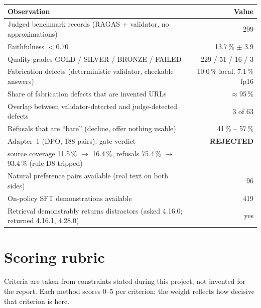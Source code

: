 \documentclass[11pt,a4paper]{article}
\begin{document}
\begin{table}[h]\centering\small
\begin{tabularx}{\textwidth}{Y r}
\toprule
\textbf{Observation} & \textbf{Value} \\
\midrule
Judged benchmark records (RAGAS + validator, no approximations) & 299 \\
 Faithfulness $<0.70$ & 13.7\,\% $\pm$ 3.9 \\
Quality grades GOLD / SILVER / BRONZE / FAILED & 229 / 51 / 16 / 3 \\
 Fabrication defects (deterministic validator, checkable answers) & 10.0\,\% local, 7.1\,\% fp16 \\
Share of fabrication defects that are invented URLs & $\approx$95\,\% \\
 Overlap between validator-detected and judge-detected defects & 3 of 63 \\
Refusals that are ``bare'' (decline, offer nothing usable) & 41\,\% -- 57\,\% \\
 Adapter~1 (DPO, 188 pairs): gate verdict & \textbf{REJECTED} \\
\quad source coverage 11.5\,\% $\rightarrow$ 16.4\,\%, refusals 75.4\,\% $\rightarrow$ 93.4\,\% (rule D8 tripped) & \\
 Natural preference pairs available (real text on both sides) & 96 \\
On-policy SFT demonstrations available & 419 \\
Retrieval demonstrably returns distractors (asked 4.16.0; returned 4.16.1, 4.28.0) & yes \\
\bottomrule
\end{tabularx}
\end{table}

\section{Scoring rubric}

Criteria are taken from constraints stated during this project, not invented for the report.
Each method scores 0--5 per criterion; the weight reflects how decisive that criterion is here.
\end{document}
